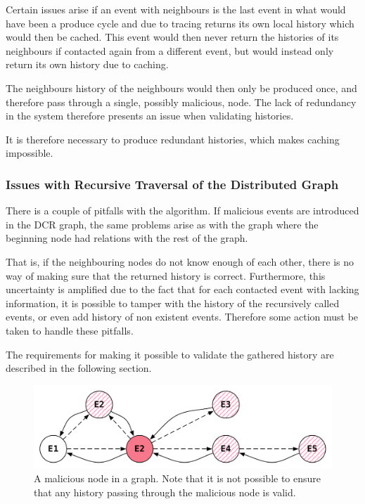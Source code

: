 	Certain issues arise if an event with neighbours is the last event in what would have been a produce cycle and due to tracing returns its own local history which would then be cached. This event would then never return the histories of its neighbours if contacted again from a different event, but would instead only return its own history due to caching. 
	
	The neighbours history of the neighbours would then only be produced once, and therefore pass through a single, possibly malicious, node. The lack of redundancy in the system therefore presents an issue when validating histories.
	
	It is therefore necessary to produce redundant histories, which makes caching impossible.
	
	\subsubsection{Issues with Recursive Traversal of the Distributed Graph}
	
	There is a couple of pitfalls with the algorithm. If malicious events are introduced in the DCR graph, the same problems arise as with the graph where the beginning node had relations with the rest of the graph. 
	
	\newpar That is, if the neighbouring nodes do not know enough of each other, there is no way of making sure that the returned history is correct. Furthermore, this uncertainty is amplified due to the fact that for each contacted event with lacking information, it is possible to tamper with the history of the recursively called events, or even add history of non existent events. Therefore some action must be taken to handle these pitfalls.
	
	The requirements for making it possible to validate the gathered history are described in the following section. 
	
	\begin{figure}[H]
		\centering
		\includegraphics[width=\textwidth]{4connect/images/recursive-evil-node.pdf}
		\caption{A malicious node in a graph. Note that it is not possible to ensure that any history passing through the malicious node is valid.}
		\label{fig:connecting:recursive-evil-node}
	\end{figure}